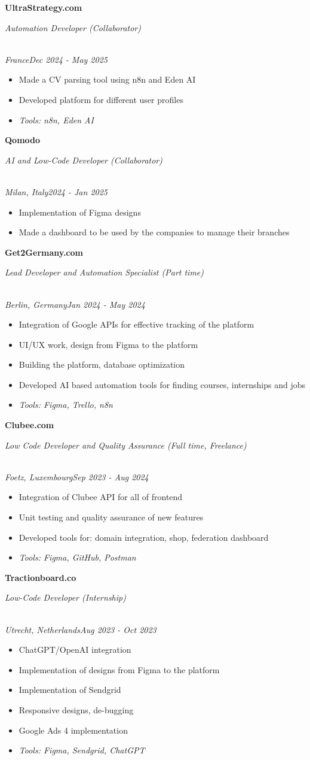 \documentclass[a4paper,10pt]{article}
\newcommand{\role}[4]{\vspace{3pt}\noindent\hspace{0.6em}\parbox[t]{0.38\textwidth}{\raggedright\textbf{#1}}\hfill\parbox[t]{0.58\textwidth}{\raggedleft\textit{#2}}\\{\textit{#3}\hfill\textit{#4}}\vspace{1pt}}
\begin{document}
\role{UltraStrategy.com}{Automation Developer (Collaborator)}{France}{Dec 2024 - May 2025}
\begin{itemize}
\item Made a CV parsing tool using n8n and Eden AI
\item Developed platform for different user profiles
\item \textit{Tools: n8n, Eden AI}
\end{itemize}

\role{Qomodo}{AI and Low-Code Developer (Collaborator)}{Milan, Italy}{2024 - Jan 2025}
\begin{itemize}
\item Implementation of Figma designs
\item Made a dashboard to be used by the companies to manage their branches
\end{itemize}

\role{Get2Germany.com}{Lead Developer and Automation Specialist (Part time)}{Berlin, Germany}{Jan 2024 - May 2024}
\begin{itemize}
\item Integration of Google APIs for effective tracking of the platform
\item UI/UX work, design from Figma to the platform
\item Building the platform, database optimization
\item Developed AI based automation tools for finding courses, internships and jobs
\item \textit{Tools: Figma, Trello, n8n}
\end{itemize}

\role{Clubee.com}{Low Code Developer and Quality Assurance (Full time, Freelance)}{Foetz, Luxembourg}{Sep 2023 - Aug 2024}
\begin{itemize}
\item Integration of Clubee API for all of frontend
\item Unit testing and quality assurance of new features
\item Developed tools for: domain integration, shop, federation dashboard
\item \textit{Tools: Figma, GitHub, Postman}
\end{itemize}

\role{Tractionboard.co}{Low-Code Developer (Internship)}{Utrecht, Netherlands}{Aug 2023 - Oct 2023}
\begin{itemize}
\item ChatGPT/OpenAI integration
\item Implementation of designs from Figma to the platform
\item Implementation of Sendgrid
\item Responsive designs, de-bugging
\item Google Ads 4 implementation
\item \textit{Tools: Figma, Sendgrid, ChatGPT}
\end{itemize}
\end{document}
